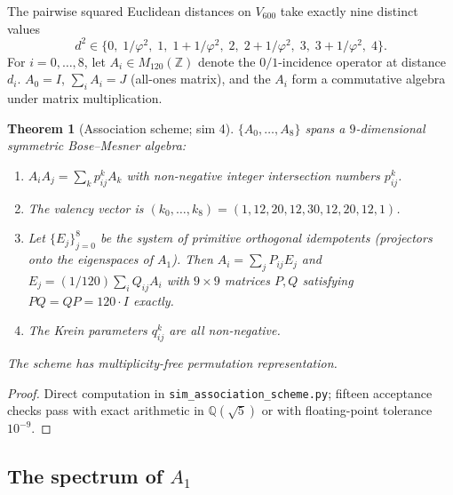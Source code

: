 \documentclass[11pt,a4paper]{article}
\newtheorem{theorem}{Theorem}
\theoremstyle{definition}
\theoremstyle{remark}
\newcommand{\Z}{\mathbb{Z}}
\newcommand{\Q}{\mathbb{Q}}
\begin{document}
The pairwise squared Euclidean distances on $V_{600}$ take exactly nine
distinct values
\[
  d^2 \in \bigl\{0,\; 1/\varphi^2,\; 1,\; 1+1/\varphi^2,\; 2,\; 2+1/\varphi^2,\; 3,\; 3+1/\varphi^2,\; 4 \bigr\}.
\]
For $i=0,\dots,8$, let $A_i \in M_{120}(\Z)$ denote the $0/1$-incidence
operator at distance $d_i$. $A_0 = I$, $\sum_i A_i = J$ (all-ones matrix),
and the $A_i$ form a commutative algebra under matrix multiplication.

\begin{theorem}[Association scheme; sim 4]\label{thm:scheme}
$\{A_0,\dots,A_8\}$ spans a $9$-dimensional symmetric Bose--Mesner algebra:
\begin{enumerate}
  \item $A_i A_j = \sum_k p_{ij}^k A_k$ with non-negative integer
    intersection numbers $p_{ij}^k$.
  \item The valency vector is $(k_0,\dots,k_8) = (1,12,20,12,30,12,20,12,1)$.
  \item Let $\{E_j\}_{j=0}^8$ be the system of primitive orthogonal
    idempotents (projectors onto the eigenspaces of $A_1$). Then
    $A_i = \sum_j P_{ij} E_j$ and $E_j = (1/120) \sum_i Q_{ij} A_i$ with
    $9\times 9$ matrices $P, Q$ satisfying $PQ = QP = 120\cdot I$ exactly.
  \item The Krein parameters $q_{ij}^k$ are all non-negative.
\end{enumerate}
The scheme has multiplicity-free permutation representation.
\end{theorem}

\begin{proof}
Direct computation in \texttt{sim\_association\_scheme.py}; fifteen acceptance
checks pass with exact arithmetic in $\Q(\sqrt 5)$ or with floating-point
tolerance $10^{-9}$.
\end{proof}

\subsection{The spectrum of $A_1$}
\end{document}
